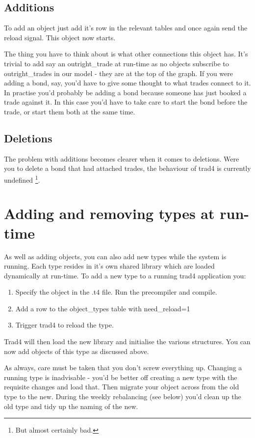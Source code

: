 \documentclass{report}
\begin{document}
\subsection{Additions}

To add an object just add it's row in the relevant tables and once again send the reload signal. This object now starts. 

The thing you have to think about is what other connections this object has. It's trivial to add say an outright_trade at run-time as no objects subscribe to outright_trades in our model - they are at the top of the graph. If you were adding a bond, say, you'd have to give some thought to what trades connect to it.  In practise you'd probably be adding a bond because someone has just booked a trade against it. In this case you'd have to take care to start the bond before the trade, or start them both at the same time.

\subsection{Deletions}

The problem with additions becomes clearer when it comes to deletions. Were you to delete a bond that had attached trades, the behaviour of trad4 is currently undefined \footnote{But almost certainly bad.}.

\section{Adding and removing types at run-time}

As well as adding objects, you can also add new types while the system is running. Each type resides in it's own shared library which are loaded dynamically at run-time. To add a new type to a running trad4 application you:

\begin{enumerate}
\item Specify the object in the .t4 file. Run the precompiler and compile.
\item Add a row to the object_types table with need_reload=1
\item Trigger trad4 to reload the type.
\end{enumerate}

Trad4 will then load the new library and initialise the various structures. You can now add objects of this type as discussed above.

As always, care must be taken that you don't screw everything up. Changing a running type is inadvisable - you'd be better off creating a new type with the requisite changes and load that. Then migrate your object across from the old type to the new. During the weekly rebalancing (see below) you'd clean up the old type and tidy up the naming of the new.
\end{document}
